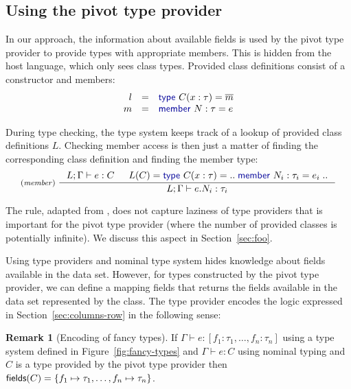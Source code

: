 \documentclass[a4paper,UKenglish]{lipics-v2016}
\theoremstyle{plain}
\theoremstyle{definition}
\newtheorem{rmrk}{Remark}
\newcommand{\kvd}[1]{\textnormal{\textcolor{kvdclr}{\sffamily #1}}}
\newcommand{\ident}[1]{\textnormal{\sffamily #1}}
\begin{document}

\subsection{Using the pivot type provider}
\label{sec:columns-tp}

In our approach, the information about available fields is used by the pivot type provider to provide
types with appropriate members. This is hidden from the host language, which only sees class types.
Provided class definitions consist of a constructor and members: 
%
\begin{equation*}
\begin{array}{rcl}
 l &=& \kvd{type}~C(x:\tau) = \overline{m} \\
 m &=& \kvd{member}~N:\tau= e
\end{array}
\end{equation*}

\noindent
During type checking, the type system keeps track of a lookup of provided class definitions $L$. 
Checking member access is then just a matter of finding the corresponding class definition and
finding the member type:
%
\begin{equation*}
\inference[(\emph{member})~]
  {L; \Gamma \vdash e : C & L(C)=\kvd{type}~C(x:\tau) = ..\;\kvd{member}~N_i : \tau_i = e_i\;..}
  {L; \Gamma \vdash e.N_i:\tau_i}
\end{equation*}

\noindent
The rule, adapted from \cite{fsdata}, does not capture laziness of type providers that is 
important for the pivot type provider (where the number of provided classes is potentially 
infinite). We discuss this aspect in Section~\ref{sec:foo}.

Using type providers and nominal type system hides knowledge about fields available
in the data set. However, for types constructed by the pivot type provider, we can define a 
mapping \ident{fields} that returns the fields available in the data set represented by the 
class. The type provider encodes the logic expressed in Section~\ref{sec:columns-row} in the
following sense:

\begin{rmrk}[Encoding of fancy types]
\label{thm:encoding-fancy}
If $\Gamma\vdash e:[f_1\!:\!\tau_1, \ldots, f_n\!:\!\tau_n]$ using a type system defined in 
Figure~\ref{fig:fancy-types} and $\Gamma\vdash e:C$ using nominal typing and $C$ is a type 
provided by the pivot type provider then $\ident{fields}(C) = \{ f_1\mapsto\tau_1, \ldots, f_n\mapsto\tau_n \}$.
\end{rmrk}
\end{document}
